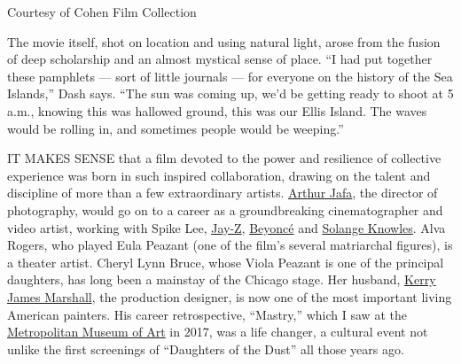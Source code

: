 Courtesy of Cohen Film Collection

The movie itself, shot on location and using natural light, arose from
the fusion of deep scholarship and an almost mystical sense of place.
``I had put together these pamphlets --- sort of little journals --- for
everyone on the history of the Sea Islands,'' Dash says. ``The sun was
coming up, we'd be getting ready to shoot at 5 a.m., knowing this was
hallowed ground, this was our Ellis Island. The waves would be rolling
in, and sometimes people would be weeping.''

IT MAKES SENSE that a film devoted to the power and resilience of
collective experience was born in such inspired collaboration, drawing
on the talent and discipline of more than a few extraordinary artists.
\href{https://www.nytimes.com/2019/08/14/t-magazine/arthur-jafa-in-bloom.html}{Arthur
Jafa}, the director of photography, would go on to a career as a
groundbreaking cinematographer and video artist, working with Spike Lee,
\href{https://www.nytimes.com/interactive/2017/11/29/t-magazine/jay-z-dean-baquet-interview.html}{Jay-Z},
\href{https://www.nytimes.com/2014/06/03/t-magazine/beyonce-the-woman-on-top-of-the-world.html}{Beyoncé}
and
\href{https://www.nytimes.com/2018/10/15/t-magazine/solange-interview.html}{Solange
Knowles}. Alva Rogers, who played Eula Peazant (one of the film's
several matriarchal figures), is a theater artist. Cheryl Lynn Bruce,
whose Viola Peazant is one of the principal daughters, has long been a
mainstay of the Chicago stage. Her husband,
\href{https://www.nytimes.com/2016/10/17/t-magazine/kerry-james-marshall-artist.html}{Kerry
James Marshall}, the production designer, is now one of the most
important living American painters. His career retrospective,
``Mastry,'' which I saw at the
\href{https://www.nytimes.com/topic/organization/metropolitan-museum-of-art}{Metropolitan
Museum of Art} in 2017, was a life changer, a cultural event not unlike
the first screenings of ``Daughters of the Dust'' all those years ago.

